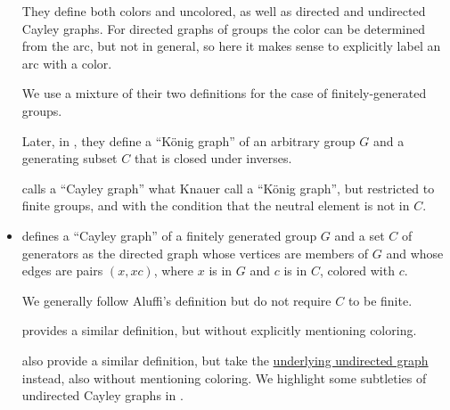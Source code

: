 \begin{remark}
\begin{itemize}
    They define both colors and uncolored, as well as directed and undirected Cayley graphs. For directed graphs of groups the color can be determined from the arc, but not in general, so here it makes sense to explicitly label an arc with a color.

    We use a mixture of their two definitions for the case of finitely-generated groups.

    Later, in \cite[def. 7.3.2]{Knauer2019AlgebraicGraphTheory}, they define a \enquote{K\"onig graph} of an arbitrary group \( G \) and a generating subset \( C \) that is closed under inverses.

     calls a \enquote{Cayley graph} what Knauer call a \enquote{K\"onig graph}, but restricted to finite groups, and with the condition that the neutral element is not in \( C \).

    \item {} defines a \enquote{Cayley graph} of a finitely generated group \( G \) and a set \( C \) of generators as the directed graph whose vertices are members of \( G \) and whose edges are pairs \( (x, xc) \), where \( x \) is in \( G \) and \( c \) is in \( C \), colored with \( c \).

    We generally follow Aluffi's definition but do not require \( C \) to be finite.

     provides a similar definition, but without explicitly mentioning coloring.

     also provide a similar definition, but take the \hyperref[def:multigraph_orientation]{underlying undirected graph} instead, also without mentioning coloring. We highlight some subtleties of undirected Cayley graphs in .
  \end{itemize}
\end{remark}

